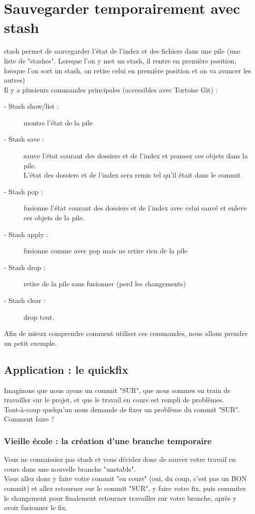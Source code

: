 \newpage
\section{Sauvegarder temporairement avec stash}

stash permet de sauvegarder l'état de l'index et des fichiers dans une pile (une liste de "stashes". Lorsque l'on y met un stash, il rentre en première position, lorsque l'on sort un stash, on retire celui en première position et on va avancer les autres) \\

Il y a plusieurs commandes principales (accessibles avec Tortoise Git) :
\begin{description}
\item[- Stash show/list : ]montre l'état de la pile
\item[- Stash save : ]sauve l'état courant des dossiers et de l'index et pousser ces objets dans la pile.\\
L'état des dossiers et de l'index sera remis tel qu'il était dans le commit
\item[- Stash pop : ]fusionne l'état courant des dossiers et de l'index avec celui sauvé et enleve ces objets de la pile.
\item[- Stash apply : ]fusionne comme avec pop mais ne retire rien de la pile
\item[- Stash drop : ]retire de la pile sans fusionner (perd les changements)
\item[- Stash clear : ]drop tout.\\ 
\end{description}

Afin de mieux comprendre comment utiliser ces commandes, nous allons prendre un petit exemple.

\newpage
\subsection{Application : le quickfix}
Imaginons que nous ayons un commit "SUR", que nous sommes en train de travailler sur le projet, et que le travail en cours est rempli de problèmes.\\
Tout-à-coup quelqu'un nous demande de fixer un problème du commit "SUR". Comment faire ?
\subsubsection{Vieille école : la création d'une branche temporaire}
Vous ne connaissiez pas stash et vous décidez donc de sauver votre travail en cours dans une nouvelle branche "unstable".\\
Vous allez donc y faire votre commit "en cours" (oui, du coup, c'est pas un BON commit) et allez retourner sur le commit "SUR", y faire votre fix, puis commiter le changement pour finalement retourner travailler sur votre branche, après y avoir fusionner le fix.\\

